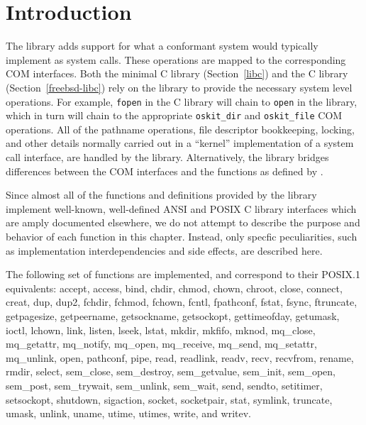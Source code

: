 %
% 
%
\label{posix-lib}
\label{extended-posix-api}

\section{Introduction}

The \posix{} library adds support for what a \posix{} conformant system
would typically implement as system calls. These \posix{} operations are
mapped to the corresponding \oskit{} COM interfaces. Both the minimal C
library (Section~\ref{libc}) and the \freebsd{} C library
(Section~\ref{freebsd-libc})
rely on the \posix{} library to provide the necessary
system level operations. For example, \texttt{fopen} in the C library will
chain to \texttt{open} in the \posix{} library, which in turn will chain to
the appropriate {\tt oskit_dir} and {\tt oskit_file} COM operations. All of
the pathname operations, file descriptor bookkeeping, locking, and other
details normally carried out in a ``kernel'' implementation of a system
call interface, are handled by the \posix{} library. Alternatively, the
\posix{} library bridges differences between the COM interfaces and the
functions as defined by \posix{}. 

Since almost all of the functions and definitions provided by the \posix{}
library implement well-known, well-defined ANSI and POSIX C library
interfaces which are amply documented elsewhere, we do not attempt to
describe the purpose and behavior of each function in this chapter.
Instead, only specfic peculiarities, such as implementation
interdependencies and side effects, are described here.

The following set of functions are implemented, and correspond to
their POSIX.1 equivalents: accept, access, bind, chdir, chmod, chown,
chroot, close, connect, creat, dup, dup2, fchdir, fchmod, fchown,
fcntl, fpathconf, fstat, fsync, ftruncate, getpagesize, getpeername,
getsockname, getsockopt, gettimeofday, getumask, ioctl, lchown, link,
listen, lseek, lstat, mkdir, mkfifo, mknod, mq_close, mq_getattr,
mq_notify, mq_open, mq_receive, mq_send, mq_setattr, mq_unlink, open,
pathconf, pipe, read, readlink, readv, recv, recvfrom, rename, rmdir,
select, sem_close, sem_destroy, sem_getvalue, sem_init, sem_open,
sem_post, sem_trywait, sem_unlink, sem_wait, send, sendto, setitimer,
setsockopt, shutdown, sigaction, socket, socketpair, stat, symlink,
truncate, umask, unlink, uname, utime, utimes, write, and writev.

